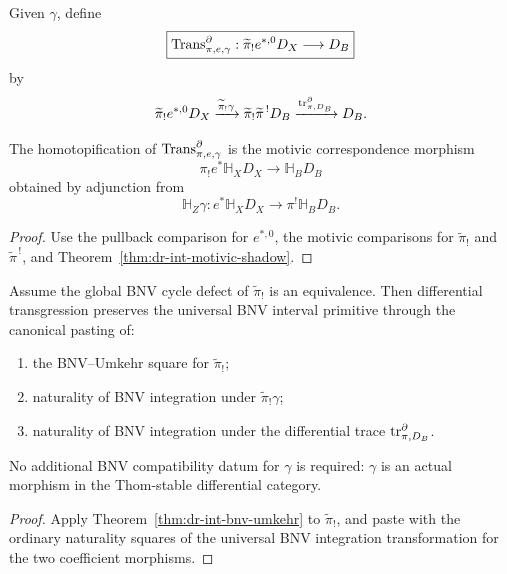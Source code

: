 \begin{definition}
\label{def:dr-int-transgression}
Given \(\gamma\), define
\[
\boxed{
    \operatorname{Trans}^{\partial}_{\pi,e,\gamma}:
    \widetilde\pi_!e^{*,0}D_X
    \longrightarrow
    D_B
}
\]
by
\[
    \widetilde\pi_!e^{*,0}D_X
    \xrightarrow{\widetilde\pi_!\gamma}
    \widetilde\pi_!\widetilde\pi^{\,!}D_B
    \xrightarrow{\operatorname{tr}^{\partial}_{\pi,D_B}}
    D_B.
\]
\end{definition}

\begin{proposition}
\label{prop:dr-int-transgression-shadow}
The homotopification of
\(\operatorname{Trans}^{\partial}_{\pi,e,\gamma}\) is the motivic correspondence morphism
\[
\boxed{
    \pi_!e^*\mathbb H_XD_X
    \longrightarrow
    \mathbb H_BD_B
}
\]
obtained by adjunction from
\[
    \mathbb H_Z\gamma:
    e^*\mathbb H_XD_X
    \longrightarrow
    \pi^!\mathbb H_BD_B.
\]
\end{proposition}

\begin{proof}
Use the pullback comparison for \(e^{*,0}\), the motivic comparisons for
\(\widetilde\pi_!\) and \(\widetilde\pi^{\,!}\), and
Theorem~\ref{thm:dr-int-motivic-shadow}.
\end{proof}

\begin{proposition}
\label{prop:dr-int-transgression-bnv}
Assume the global BNV cycle defect of \(\widetilde\pi_!\) is an equivalence.
Then differential transgression preserves the universal BNV interval primitive
through the canonical pasting of:

\begin{enumerate}
\item the BNV--Umkehr square for \(\widetilde\pi_!\);
\item naturality of BNV integration under
\(\widetilde\pi_!\gamma\);
\item naturality of BNV integration under the differential trace
\(\operatorname{tr}^{\partial}_{\pi,D_B}\).
\end{enumerate}

No additional BNV compatibility datum for \(\gamma\) is required: \(\gamma\)
is an actual morphism in the Thom-stable differential category.
\end{proposition}

\begin{proof}
Apply Theorem~\ref{thm:dr-int-bnv-umkehr} to
\(\widetilde\pi_!\), and paste with the ordinary naturality squares of the
universal BNV integration transformation for the two coefficient morphisms.
\end{proof}

